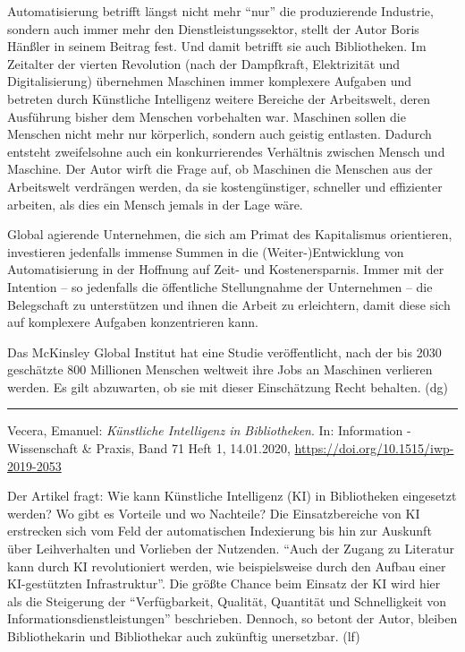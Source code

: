 \documentclass[a4paper,
fontsize=11pt,
oneside,
numbers=noperiodatend,
parskip=half-,
bibliography=totoc,
final
]{scrartcl}
\begin{document}
Automatisierung betrifft längst nicht mehr \enquote{nur} die
produzierende Industrie, sondern auch immer mehr den
Dienstleistungssektor, stellt der Autor Boris Hänßler in seinem Beitrag
fest. Und damit betrifft sie auch Bibliotheken. Im Zeitalter der vierten
Revolution (nach der Dampfkraft, Elektrizität und Digitalisierung)
übernehmen Maschinen immer komplexere Aufgaben und betreten durch
Künstliche Intelligenz weitere Bereiche der Arbeitswelt, deren
Ausführung bisher dem Menschen vorbehalten war. Maschinen sollen die
Menschen nicht mehr nur körperlich, sondern auch geistig entlasten.
Dadurch entsteht zweifelsohne auch ein konkurrierendes Verhältnis
zwischen Mensch und Maschine. Der Autor wirft die Frage auf, ob
Maschinen die Menschen aus der Arbeitswelt verdrängen werden, da sie
kostengünstiger, schneller und effizienter arbeiten, als dies ein Mensch
jemals in der Lage wäre.

Global agierende Unternehmen, die sich am Primat des Kapitalismus
orientieren, investieren jedenfalls immense Summen in die
(Weiter-)Entwicklung von Automatisierung in der Hoffnung auf Zeit- und
Kostenersparnis. Immer mit der Intention -- so jedenfalls die
öffentliche Stellungnahme der Unternehmen -- die Belegschaft zu
unterstützen und ihnen die Arbeit zu erleichtern, damit diese sich auf
komplexere Aufgaben konzentrieren kann.

Das McKinsley Global Institut hat eine Studie veröffentlicht, nach der
bis 2030 geschätzte 800 Millionen Menschen weltweit ihre Jobs an
Maschinen verlieren werden. Es gilt abzuwarten, ob sie mit dieser
Einschätzung Recht behalten. (dg)

\begin{center}\rule{0.5\linewidth}{0.5pt}\end{center}

Vecera, Emanuel: \emph{Künstliche Intelligenz in Bibliotheken}. In:
Information - Wissenschaft \& Praxis, Band 71 Heft 1, 14.01.2020,
\url{https://doi.org/10.1515/iwp-2019-2053}

Der Artikel fragt: Wie kann Künstliche Intelligenz (KI) in Bibliotheken
eingesetzt werden? Wo gibt es Vorteile und wo Nachteile? Die
Einsatzbereiche von KI erstrecken sich vom Feld der automatischen
Indexierung bis hin zur Auskunft über Leihverhalten und Vorlieben der
Nutzenden. \enquote{Auch der Zugang zu Literatur kann durch KI
revolutioniert werden, wie beispielsweise durch den Aufbau einer
KI-gestützten Infrastruktur}. Die größte Chance beim Einsatz der KI wird
hier als die Steigerung der \enquote{Verfügbarkeit, Qualität, Quantität
und Schnelligkeit von Informationsdienstleistungen} beschrieben.
Dennoch, so betont der Autor, bleiben Bibliothekarin und Bibliothekar
auch zukünftig unersetzbar. (lf)
\end{document}
